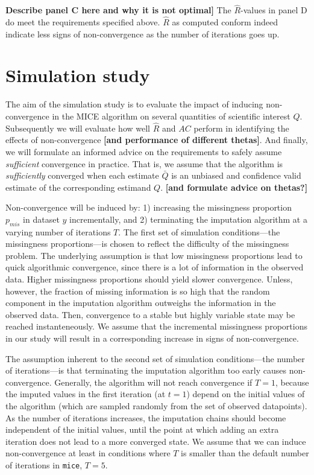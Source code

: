 \documentclass[Royal,times,sageh]{sagej}
\begin{document}
\textbf{Describe panel C here and why it is not optimal{]}} The \(\widehat{R}\)-values in panel D do meet the requirements specified above. \(\widehat{R}\) as computed conform \citet{veht19} indeed indicate less signs of non-convergence as the number of iterations goes up.

\hypertarget{simulation-study}{%
\section{Simulation study}\label{simulation-study}}

The aim of the simulation study is to evaluate the impact of inducing non-convergence in the MICE algorithm on several quantities of scientific interest \(Q\). Subsequently we will evaluate how well \(\widehat{R}\) and \(AC\) perform in identifying the effects of non-convergence \textbf{{[}and performance of different thetas{]}}. And finally, we will formulate an informed advice on the requirements to safely assume \emph{sufficient} convergence in practice. That is, we assume that the algorithm is \emph{sufficiently} converged when each estimate \(\bar{Q}\) is an unbiased and confidence valid estimate of the corresponding estimand \(Q\). \textbf{{[}and formulate advice on thetas?{]}}

Non-convergence will be induced by: 1) increasing the missingness proportion \(p_{mis}\) in dataset \(y\) incrementally, and 2) terminating the imputation algorithm at a varying number of iterations \(T\). The first set of simulation conditions---the missingness proportions---is chosen to reflect the difficulty of the missingness problem. The underlying assumption is that low missingness proportions lead to quick algorithmic convergence, since there is a lot of information in the observed data. Higher missingness proportions should yield slower convergence. Unless, however, the fraction of missing information is so high that the random component in the imputation algorithm outweighs the information in the observed data. Then, convergence to a stable but highly variable state may be reached instanteneously. We assume that the incremental missingness proportions in our study will result in a corresponding increase in signs of non-convergence.

The assumption inherent to the second set of simulation conditions---the number of iterations---is that terminating the imputation algorithm too early causes non-convergence. Generally, the algorithm will not reach convergence if \(T=1\), because the imputed values in the first iteration (at \(t=1\)) depend on the initial values of the algorithm (which are sampled randomly from the set of observed datapoints). As the number of iterations increases, the imputation chains should become independent of the initial values, until the point at which adding an extra iteration does not lead to a more converged state. We assume that we can induce non-convergence at least in conditions where \(T\) is smaller than the default number of iterations in \texttt{mice}, \(T=5\).
\end{document}
